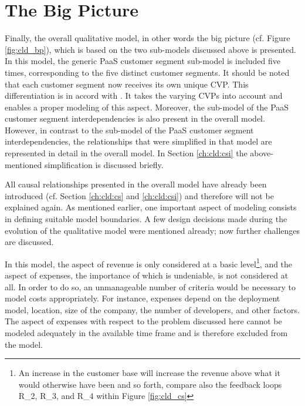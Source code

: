 \section{The Big Picture}\label{ch:cld:bp}

Finally, the overall qualitative model, in other words the big picture (cf. Figure \ref{fig:cld_bp}), which is based on the two sub-models discussed above is presented. In this model, the generic \ac{PaaS} customer segment sub-model is included five times, corresponding to the five distinct customer segments. It should be noted that each customer segment now receives its own unique \ac{CVP}. This differentiation is in accord with \citet{Johnson2008}. It takes the varying \acp{CVP} into account and enables a proper modeling of this aspect. Moreover, the sub-model of the \ac{PaaS} customer segment interdependencies is also present in the overall model. However, in contrast to the sub-model of the \ac{PaaS} customer segment interdependencies, the relationships that were simplified in that model are represented in detail in the overall model. In Section \ref{ch:cld:csi} the above-mentioned simplification is discussed briefly.

All causal relationships presented in the overall model have already been introduced (cf. Section \ref{ch:cld:cs} and \ref{ch:cld:csi}) and therefore will not be explained again. As mentioned earlier, one important aspect of modeling consists in defining suitable model boundaries. A few design decisions made during the evolution of the qualitative model were mentioned already; now further challenges are discussed.

In this model, the aspect of revenue is only considered at a basic level\footnote{An increase in the customer base will increase the revenue above what it would otherwise have been and so forth, compare also the feedback loops R\_2, R\_3, and R\_4 within Figure \ref{fig:cld_cs}}, and the aspect of expenses, the importance of which is undeniable, is not considered at all. In order to do so, an unmanageable number of criteria would be necessary to model costs appropriately. For instance, expenses depend on the deployment model, location, size of the company, the number of developers, and other factors. The aspect of expenses with respect to the problem discussed here cannot be modeled adequately in the available time frame and is therefore excluded from the model.

